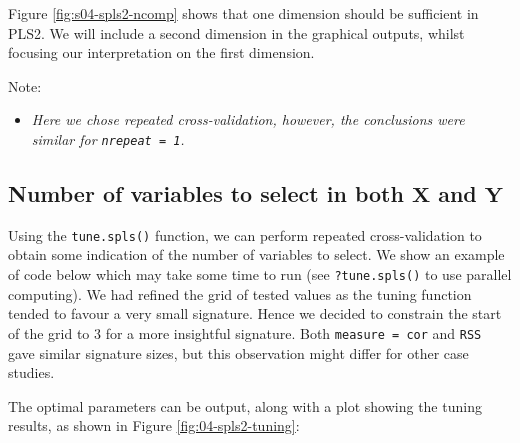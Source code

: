 \documentclass[
]{book}
\providecommand{\tightlist}{%
  \setlength{\itemsep}{0pt}\setlength{\parskip}{0pt}}
\begin{document}
Figure \ref{fig:s04-spls2-ncomp} shows that one dimension should be sufficient in PLS2. We will include a second dimension in the graphical outputs, whilst focusing our interpretation on the first dimension.

Note:

\begin{itemize}
\tightlist
\item
  \emph{Here we chose repeated cross-validation, however, the conclusions were similar for \texttt{nrepeat\ =\ 1}.}
\end{itemize}

\hypertarget{04:spls2-tuning}{%
\subsection{\texorpdfstring{Number of variables to select in both \(\boldsymbol X\) and \(\boldsymbol Y\)}{Number of variables to select in both \textbackslash boldsymbol X and \textbackslash boldsymbol Y}}\label{04:spls2-tuning}}

Using the \texttt{tune.spls()} function, we can perform repeated cross-validation to obtain some indication of the number of variables to select. We show an example of code below which may take some time to run (see \texttt{?tune.spls()} to use parallel computing). We had refined the grid of tested values as the tuning function tended to favour a very small signature. Hence we decided to constrain the start of the grid to 3 for a more insightful signature. Both \texttt{measure\ =\ \textquotesingle{}cor} and \texttt{RSS} gave similar signature sizes, but this observation might differ for other case studies.

The optimal parameters can be output, along with a plot showing the tuning results, as shown in Figure \ref{fig:04-spls2-tuning}:
\end{document}
